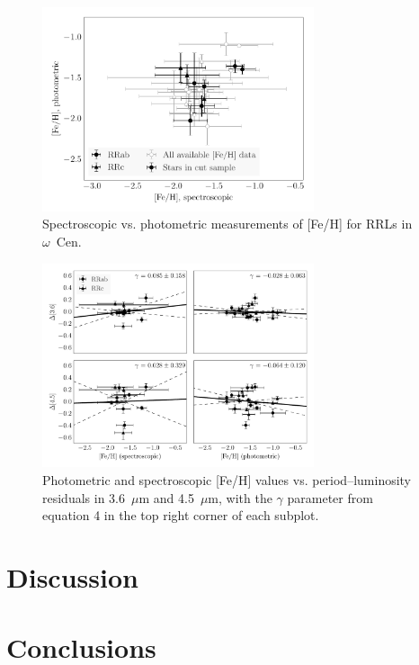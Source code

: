 \documentclass[a4paper,fleqn,usenatbib]{mnras}
\begin{document}
\begin{figure}
\begin{center}
\includegraphics[width=80mm]{reworked_fitting_code/final_plots/metallicity_comparison_all_clipped.pdf}
\caption{Spectroscopic vs. photometric measurements of [Fe/H] for RRLs in $\omega$~Cen.}
\label{fig:metallicity_comparison}
\end{center}
\end{figure}


\begin{figure}
\begin{center}
\includegraphics[width=80mm]{reworked_fitting_code/final_plots/metallicity_vs_residuals_m4_clipped.pdf}
\caption{Photometric and spectroscopic [Fe/H] values vs. period--luminosity residuals in 3.6~$\mu$m and 4.5~$\mu$m, with the $\gamma$ parameter from equation 4 in the top right corner of each subplot.}
\label{fig:metallicity_residuals}
\end{center}
\end{figure}


\section{Discussion}
\label{sec:discussion}

\section{Conclusions}
\label{sec:conclusions}
\end{document}
